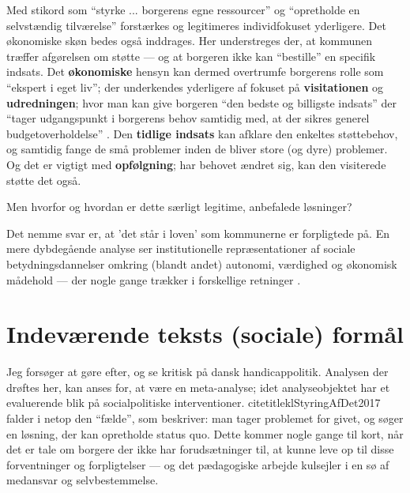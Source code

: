 Med stikord som “styrke ... borgerens egne ressourcer” og “opretholde en selvstændig tilværelse” forstærkes og legitimeres individfokuset yderligere.
Det økonomiske skøn bedes også inddrages. Her understreges der, at kommunen træffer afgørelsen om støtte — og at borgeren ikke kan “bestille” en specifik indsats.
Det \textbf{økonomiske} hensyn kan dermed overtrumfe borgerens rolle som “ekspert i eget liv”; der underkendes yderligere af fokuset på \textbf{visitationen} og \textbf{udredningen}; hvor man kan give borgeren “den bedste og billigste indsats” der “tager udgangspunkt i borgerens behov samtidig med, at der sikres generel budgetoverholdelse” .
Den \textbf{tidlige indsats} kan afklare den enkeltes støttebehov, og samtidig fange de små problemer inden de bliver store (og dyre) problemer.
Og det er vigtigt med \textbf{opfølgning}; har behovet ændret sig, kan den visiterede støtte det også.

Men hvorfor og hvordan er dette særligt legitime, anbefalede løsninger? 

Det nemme svar er, at 'det står i loven' som kommunerne er forpligtede på.
En mere dybdegående analyse ser institutionelle repræsentationer af sociale betydningsdannelser omkring (blandt andet) autonomi, værdighed og økonomisk mådehold --- der nogle gange trækker i forskellige retninger \autocite{moutsiosSocialeInstitutionerOg2016}.

\section{Indeværende teksts (sociale) formål}
Jeg forsøger at gøre  efter, og se kritisk på dansk handicappolitik.
Analysen der drøftes her, kan anses for, at være en meta-analyse; idet analyseobjektet har et evaluerende blik på socialpolitiske interventioner.
citetitle{klStyringAfDet2017} falder i netop den “fælde”, som \citeauthor{scheurichPolicyArchaeologyNew1994} beskriver: man tager problemet for givet, og søger en løsning, der kan opretholde status quo.
Dette kommer nogle gange til kort, når det er tale om borgere der ikke har forudsætninger til, at kunne leve op til disse forventninger og forpligtelser --- og det pædagogiske arbejde kulsejler i en sø af medansvar og selvbestemmelse.
